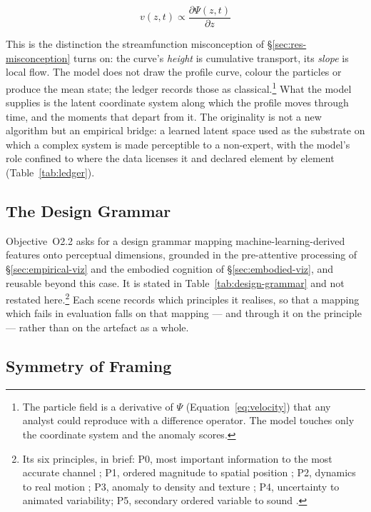 \begin{equation}
\label{eq:velocity}
v(z, t) \propto \frac{\partial \Psi(z, t)}{\partial z}
\end{equation}

\noindent This is the distinction the streamfunction misconception of \S\ref{sec:res-misconception} turns on: the curve's \emph{height} is cumulative transport, its \emph{slope} is local flow. The model does not draw the profile curve, colour the particles or produce the mean state; the ledger records those as classical.\footnote{The particle field is a derivative of $\Psi$ (Equation~\ref{eq:velocity}) that any analyst could reproduce with a difference operator. The model touches only the coordinate system and the anomaly scores.} What the model supplies is the latent coordinate system along which the profile moves through time, and the moments that depart from it. The originality is not a new algorithm but an empirical bridge: a learned latent space used as the substrate on which a complex system is made perceptible to a non-expert, with the model's role confined to where the data licenses it and declared element by element (Table~\ref{tab:ledger}).

\subsection{The Design Grammar}
\label{subsec:grammar}

Objective~O2.2 asks for a design grammar mapping machine-learning-derived features onto perceptual dimensions, grounded in the pre-attentive processing of \S\ref{sec:empirical-viz} and the embodied cognition of \S\ref{sec:embodied-viz}, and reusable beyond this case. It is stated in Table~\ref{tab:design-grammar} and not restated here.\footnote{Its six principles, in brief: P0, most important information to the most accurate channel \parencite{munzner2014,bertin1983}; P1, ordered magnitude to spatial position \parencite{clevelandmcgill1984}; P2, dynamics to real motion \parencite{sterman2008,cronin2009}; P3, anomaly to density and texture \parencite{bertin1983,ware2021}; P4, uncertainty to animated variability; P5, secondary ordered variable to sound \parencite{hermann2011}.} Each scene records which principles it realises, so that a mapping which fails in evaluation falls on that mapping --- and through it on the principle --- rather than on the artefact as a whole.

\subsection{Symmetry of Framing}
\label{subsec:symmetry}


